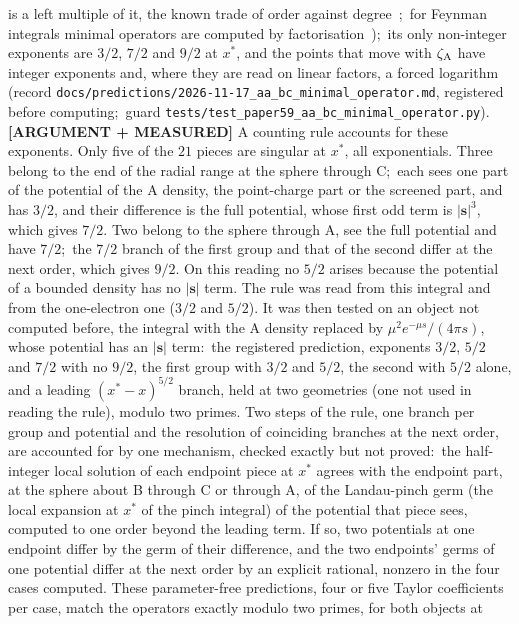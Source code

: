 \documentclass[aps,pra,twocolumn,superscriptaddress,longbibliography]{revtex4-2}
\begin{document}
is a left multiple of it, the known trade of order against
degree~\cite{chen2013desing};\ for Feynman integrals minimal operators are
computed by factorisation~\cite{lairez_vanhove2023});\ its only non-integer exponents are $3/2$, $7/2$ and $9/2$ at
$x^{*}$, and the points that move with $\zeta_{\rm A}$ have integer exponents and, where
they are read on linear factors, a forced logarithm (record \texttt{docs/predictions/2026-11-17\_aa\_bc\_minimal\_operator.md},
registered before computing;\ guard
\texttt{tests/test\_paper59\_aa\_bc\_minimal\_operator.py}).  \textbf{[ARGUMENT + MEASURED]} A
counting rule accounts for these exponents.  Only five of the $21$ pieces are singular at
$x^{*}$, all exponentials.  Three belong to the end of the radial range at the sphere through
C;\ each sees one part of the potential of the A density, the point-charge part or the screened
part, and has $3/2$, and their difference is the full potential, whose first odd term is
$|\mathbf{s}|^3$, which gives $7/2$.  Two belong to the sphere through A, see the full
potential and have $7/2$;\ the $7/2$ branch of the first group and that of the second differ at
the next order, which gives $9/2$.  On this reading no $5/2$ arises because the potential of a
bounded density has no $|\mathbf{s}|$ term.  The
rule was read from this integral and from the one-electron one ($3/2$ and $5/2$).  It was then
tested on an object not computed before, the integral with the A density replaced by
$\mu^2e^{-\mu s}/(4\pi s)$, whose potential has an $|\mathbf{s}|$ term:\ the registered
prediction, exponents $3/2$, $5/2$ and $7/2$ with no $9/2$, the first group with $3/2$ and
$5/2$, the second with $5/2$ alone, and a leading $(x^{*}-x)^{5/2}$ branch, held at two
geometries (one not used in reading the rule), modulo two primes.  Two steps of the rule, one
branch per group and potential and the resolution of coinciding branches at the next order,
are accounted for by one mechanism, checked exactly but not proved:\ the half-integer local
solution of each endpoint piece at $x^{*}$ agrees with the endpoint part, at the sphere about B
through C or through A, of the Landau-pinch germ (the local expansion at $x^{*}$ of the pinch
integral) of the potential that piece sees, computed to one order beyond the leading term.  If so, two potentials at one endpoint differ by the germ of their
difference, and the two endpoints' germs of one potential differ at the next order by an explicit
rational, nonzero in the four cases computed.  These parameter-free predictions, four or five
Taylor coefficients per case, match the operators exactly modulo two primes, for both objects at
\end{document}
